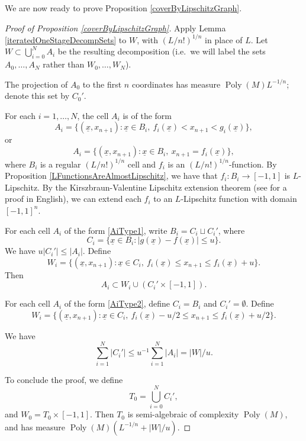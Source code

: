 \documentclass[letterpaper, reqno,11pt]{article}
\numberwithin{equation}{section}
\newcommand{\poly}{\operatorname{Poly}}
\numberwithin{thm}{section}
\theoremstyle{remark}
\begin{document}
\noindent We are now ready to prove Proposition \ref{coverByLipschitzGraph}. 
\begin{proof}[Proof of Proposition \ref{coverByLipschitzGraph}]
Apply Lemma \ref{iteratedOneStageDecompSets} to $W$, with $(L/n!)^{1/n}$ in place of $L$. Let $W \subset\bigcup_{i=0}^N A_i$ be the resulting decomposition (i.e.~we will label the sets $A_0,\ldots,A_N$ rather than $W_0,\ldots,W_N$). 


The projection of $A_0$ to the first $n$ coordinates has measure $\poly(M) L^{-1/n}$; denote this set by $C_0'$.
 
For each $i=1,\ldots,N$, the cell $A_i$ is of the form
\begin{equation}\label{AiType1}
A_i = \{(\underline x, x_{n+1})\colon \underline x \in B_i,\ f_i(\underline x) < x_{n+1} < g_i(\underline x)\},
\end{equation}
or
\begin{equation}\label{AiType2}
A_i = \{(\underline x, x_{n+1})\colon \underline x \in B_i,\ x_{n+1} = f_i(\underline x)\},
\end{equation}
where $B_i$ is a regular $(L/n!)^{1/n}$ cell and $f_i$ is an $(L/n!)^{1/n}$-function. By Proposition \ref{LFunctionsAreAlmostLipschitz}, we have that $f_i\colon B_i\to[-1,1]$ is $L$-Lipschitz.  By the Kirszbraun-Valentine Lipschitz extension theorem \cite{Kirs} (see \cite[Theorem 1.31]{Schw} for a proof in English), we can extend each $f_{i}$ to an $L$-Lipschitz function with domain $[-1,1]^n$.


For each cell $A_i$ of the form \eqref{AiType1}, write $B_i = C_i \sqcup C_i'$, where
\[
C_i = \{\underline x \in B_i\colon |g(\underline x) - f(\underline x)| \leq u \}.
\]
We have $u|C_i'|\leq |A_i|.$ Define
\[
W_i = \{(\underline x, x_{n+1})\colon \underline x \in C_i,\ f_i(\underline x)\leq x_{n+1}\leq f_i(\underline x)+u\}.
\] 
Then
\[
A_i \subset W_i \cup (C_i'\times[-1,1]).
\]



For each cell $A_i$ of the form \eqref{AiType2}, define $C_i=B_i$ and $C_i'=\emptyset.$ Define
\[
W_i = \{(\underline x, x_{n+1})\colon \underline x \in C_i,\ f_i(\underline x)-u/2\leq x_{n+1}\leq f_i(\underline x)+u/2\}.
\] 


We have 
\begin{equation}\label{boundDiPrime}
\sum_{i=1}^N |C_i'|\leq u^{-1}\sum_{i=1}^N |A_i| = |W|/u.
\end{equation}

To conclude the proof, we define 
\[
T_0 = \bigcup_{i=0}^N C_i',
\]
and $W_0 = T_0\times[-1,1]$. Then $T_0$ is semi-algebraic of complexity $\poly(M)$, and has measure $\poly(M)(L^{-1/n}+|W|/u)$.
\end{proof}
\end{document}
